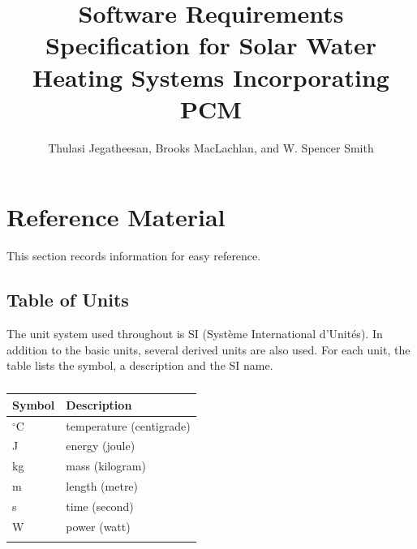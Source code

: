 \documentclass[12pt]{article}
\title{Software Requirements Specification for Solar Water Heating Systems Incorporating PCM}
\author{Thulasi Jegatheesan, Brooks MacLachlan, and W. Spencer Smith}
\begin{document}
\maketitle
\tableofcontents
\newpage
\section{Reference Material}
\label{Sec:RefMat}
This section records information for easy reference.
\subsection{Table of Units}
\label{Sec:ToU}
The unit system used throughout is SI (Système International d'Unités). In addition to the basic units, several derived units are also used. For each unit, the table lists the symbol, a description and the SI name.
\begin{longtable}{l l}
\toprule
Symbol & Description
\\
\midrule
\endhead
${}^{\circ}$C & temperature (centigrade)
\\
J & energy (joule)
\\
kg & mass (kilogram)
\\
m & length (metre)
\\
s & time (second)
\\
W & power (watt)
\\
\bottomrule
\caption{}
\label{Table:ToU}
\end{longtable}
\end{document}

